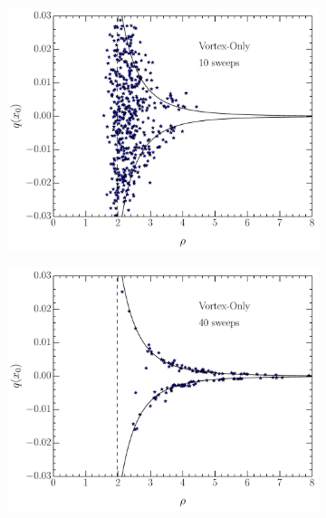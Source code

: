 \begin{figure}
\begin{subfigure}[]{0.5\textwidth}
\includegraphics[width=\columnwidth]{./VOPGcool10.pdf}
\end{subfigure}
\begin{subfigure}[]{0.5\textwidth}
\label{VOcool40}
\includegraphics[width=\columnwidth]{./VOPGcool40.pdf}
\end{subfigure}
\begin{subfigure}[]{0.5\textwidth}
\label{VRcool10}

\end{subfigure}
\end{figure}
